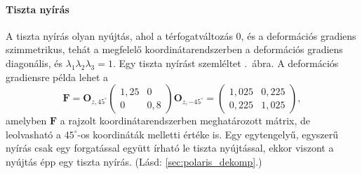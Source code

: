 \documentclass[12pt,a4paper]{scrartcl}
\let\mathbf\bm
\begin{document}
\paragraph{Tiszta nyírás} \label{sec:tiszta_nyiras}
A tiszta nyírás olyan nyújtás, ahol a térfogatváltozás 0, és a deformációs gradiens szimmetrikus, tehát a megfelelő koordinátarendszerben a deformációs gradiens diagonális, és ${\lambda _1}{\lambda _2}{\lambda _3} = 1$. Egy tiszta nyírást szemléltet \az{\ref{fig:tiszta_nyiras}}.\ ábra. A deformációs gradiensre példa lehet a 
\[{\mathbf{F}} = {{\mathbf{O}}_{z,45^\circ }}\left( {\begin{array}{*{20}{c}}
  {1,25}&0 \\ 
  0&{0,8} 
\end{array}} \right){{\mathbf{O}}_{z, - 45^\circ }} = \left( {\begin{array}{*{20}{c}}
  {1,025}&{0,225} \\ 
  {0,225}&{1,025} 
\end{array}} \right),\]
amelyben ${\mathbf{F}}$ a rajzolt koordinátarendszerben meghatározott mátrix, de leolvasható a $45^\circ$-os koordináták melletti értéke is. Egy egytengelyű, egyszerű nyírás csak egy forgatással együtt írható le tiszta nyújtással, ekkor viszont a nyújtás épp egy tiszta nyírás. (Lásd: \ref{sec:polaris_dekomp}.)
\end{document}
